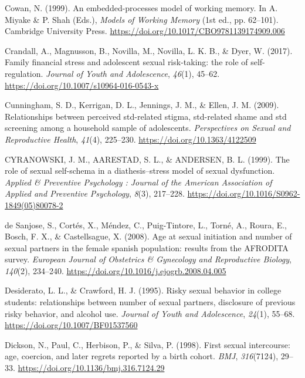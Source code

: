 \documentclass[
  donotrepeattitle,doc, 12pt, a4paper,floatsintext]{apa7}
\newlength{\cslhangindent}
\newlength{\cslentryspacingunit} %
\newenvironment{CSLReferences}[2] %
 {%
  \setlength{\parindent}{0pt}
  \ifodd #1
  \let\oldpar\par
  \def\par{\hangindent=\cslhangindent\oldpar}
  \fi
  \setlength{\parskip}{#2\cslentryspacingunit}
 }%
 {}
\begin{document}
\begin{CSLReferences}{1}{0}
\leavevmode{}%
Cowan, N. (1999). An embedded-processes model of working memory. In A. Miyake \& P. Shah (Eds.), \emph{Models of Working Memory} (1st ed., pp. 62--101). Cambridge University Press. \url{https://doi.org/10.1017/CBO9781139174909.006}

\leavevmode{}%
Crandall, A., Magnusson, B., Novilla, M., Novilla, L. K. B., \& Dyer, W. (2017). Family financial stress and adolescent sexual risk-taking: the role of self-regulation. \emph{Journal of Youth and Adolescence}, \emph{46}(1), 45--62. \url{https://doi.org/10.1007/s10964-016-0543-x}

\leavevmode{}%
Cunningham, S. D., Kerrigan, D. L., Jennings, J. M., \& Ellen, J. M. (2009). Relationships between perceived std-related stigma, std-related shame and std screening among a household sample of adolescents. \emph{Perspectives on Sexual and Reproductive Health}, \emph{41}(4), 225--230. \url{https://doi.org/10.1363/4122509}

\leavevmode{}%
CYRANOWSKI, J. M., AARESTAD, S. L., \& ANDERSEN, B. L. (1999). The role of sexual self-schema in a diathesis--stress model of sexual dysfunction. \emph{Applied \& Preventive Psychology : Journal of the American Association of Applied and Preventive Psychology}, \emph{8}(3), 217--228. \url{https://doi.org/10.1016/S0962-1849(05)80078-2}

\leavevmode{}%
de Sanjose, S., Cortés, X., Méndez, C., Puig-Tintore, L., Torné, A., Roura, E., Bosch, F. X., \& Castellsague, X. (2008). Age at sexual initiation and number of sexual partners in the female spanish population: results from the AFRODITA survey. \emph{European Journal of Obstetrics \& Gynecology and Reproductive Biology}, \emph{140}(2), 234--240. \url{https://doi.org/10.1016/j.ejogrb.2008.04.005}

\leavevmode{}%
Desiderato, L. L., \& Crawford, H. J. (1995). Risky sexual behavior in college students: relationships between number of sexual partners, disclosure of previous risky behavior, and alcohol use. \emph{Journal of Youth and Adolescence}, \emph{24}(1), 55--68. \url{https://doi.org/10.1007/BF01537560}

\leavevmode{}%
Dickson, N., Paul, C., Herbison, P., \& Silva, P. (1998). First sexual intercourse: age, coercion, and later regrets reported by a birth cohort. \emph{BMJ}, \emph{316}(7124), 29--33. \url{https://doi.org/10.1136/bmj.316.7124.29}


\end{CSLReferences}
\end{document}
